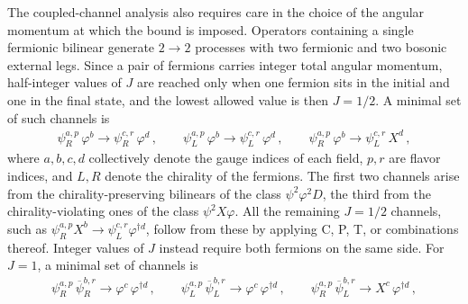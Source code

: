 The coupled-channel analysis also requires care in the choice of the angular momentum at which the
bound is imposed. 
Operators containing a single fermionic bilinear generate $2\to2$ processes with
two fermionic and two bosonic external legs. Since a pair of fermions carries integer total angular
momentum, half-integer values of $J$ are reached only when one fermion sits in the initial and one in
the final state, and the lowest allowed value is then $J=1/2$. A minimal set of such channels is
\begin{gather}
    \psi_R^{a,p}\,\varphi^{b} \to \psi_R^{c,r}\,\varphi^{d}\,,\qquad
    \psi_L^{a,p}\,\varphi^{b} \to \psi_L^{c,r}\,\varphi^{d}\,,\qquad
    \psi_R^{a,p}\,\varphi^{b} \to \psi_L^{c,r}\,X^{d}\,,
\end{gather}
where $a,b,c,d$ collectively denote the gauge indices of each field, $p,r$ are flavor
indices, and $L,R$ denote the chirality of the fermions. The first two channels arise from the
chirality-preserving bilinears of the class $\psi^2\varphi^2D$, the third from the
chirality-violating ones of the class $\psi^2X\varphi$. All the remaining $J=1/2$ channels, such as
$\psi_R^{a,p}X^{b}\to\psi_L^{c,r}\varphi^{\dagger d}$, follow from these by applying C, P, T, or
combinations thereof.
Integer values of $J$ instead require both fermions on the same side. For $J=1$, a
minimal set of channels is
\begin{gather}
    \psi_R^{a,p}\,\overline\psi_R^{b,r} \to \varphi^{c}\,\varphi^{\dagger d}\,,\qquad
    \psi_L^{a,p}\,\overline\psi_L^{b,r} \to \varphi^{c}\,\varphi^{\dagger d}\,,\qquad
    \psi_R^{a,p}\,\overline\psi_L^{b,r} \to X^{c}\,\varphi^{\dagger d}\,,
\end{gather}
